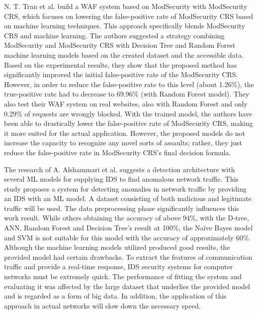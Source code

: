 N. T. Tran et al. \cite{Tin} build a WAF system based on ModSecurity with ModSecurity CRS, which focuses on lowering the false-positive rate of ModSecurity CRS based on machine learning techniques. This approach specifically blends ModSecurity CRS and machine learning. The authors suggested a strategy combining ModSecurity and ModSecurity CRS with Decision Tree and Random Forest machine learning models based on the created dataset and the accessible data. Based on the experimental results, they show that the proposed method has signiﬁcantly improved the initial false-positive rate of the ModSecurity CRS. However, in order to reduce the false-positive rate to this level (about 1.26\%), the true-positive rate had to decrease to 69.96\% (with Random Forest model). They also test their WAF system on real websites, also with Random Forest and only 0.29\% of requests are wrongly blocked. With the trained model, the authors have been able to drastically lower the false-positive rate of ModSecurity CRS, making it more suited for the actual application. However, the proposed models do not increase the capacity to recognize any novel sorts of assaults; rather, they just reduce the false-positive rate in ModSecurity CRS's final decision formula.

The research of A. Alshammari et al. \cite{Alshammari} suggests a detection architecture with several ML models for supplying IDS to find anomalous network traffic. This study proposes a system for detecting anomalies in network traffic by providing an IDS with an ML model. A dataset consisting of both malicious and legitimate traffic will be used. The data preprocessing phase significantly influences this work result. While others obtaining the accuracy of above 94\%, with the D-tree, ANN, Random Forest and Decision Tree's result at 100\%, the Naïve Bayes model and SVM is not suitable for this model with the accuracy of approximately 60\%. Although the machine learning models utilized produced good results, the provided model had certain drawbacks. To extract the features of communication traffic and provide a real-time response, IDS security systems for computer networks must be extremely quick. The performance of fitting the system and evaluating it was affected by the large dataset that underlies the provided model and is regarded as a form of big data. In addition, the application of this approach in actual networks will slow down the necessary speed.

